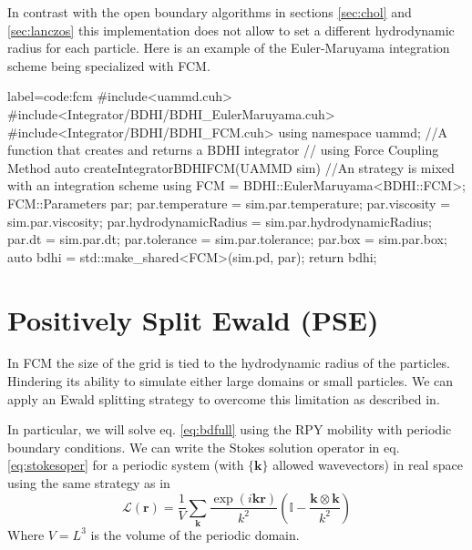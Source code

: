 \documentclass[ twoside,openright,titlepage,numbers=noenddot,%
headinclude,footinclude,cleardoublepage=empty,abstract=on,
BCOR=5mm,paper=a4,fontsize=11pt, dvipsnames
]{scrreprt}
\renewcommand{\vec}[1]{\bm{#1}}
\newcommand{\oper}[1]{\mathcal{#1}}
\newcommand{\fpos}{r}
\begin{document}
In contrast with the open boundary algorithms in sections \ref{sec:chol} and \ref{sec:lanczos} this implementation does not allow to set a different hydrodynamic radius for each particle.
Here is an example of the Euler-Maruyama integration scheme being specialized with \gls{FCM}.
\begin{code2} {label=code:fcm}
#include<uammd.cuh>
#include<Integrator/BDHI/BDHI_EulerMaruyama.cuh>
#include<Integrator/BDHI/BDHI_FCM.cuh>
using namespace uammd;
//A function that creates and returns a BDHI integrator
// using Force Coupling Method
auto createIntegratorBDHIFCM(UAMMD sim){   
  //An strategy is mixed with an integration scheme
  using FCM = BDHI::EulerMaruyama<BDHI::FCM>;
  FCM::Parameters par;
  par.temperature = sim.par.temperature;
  par.viscosity = sim.par.viscosity;
  par.hydrodynamicRadius = sim.par.hydrodynamicRadius;
  par.dt = sim.par.dt;
  par.tolerance = sim.par.tolerance;
  par.box = sim.par.box;
  auto bdhi = std::make_shared<FCM>(sim.pd, par);
  return bdhi;
}
\end{code2}

\newpage

\section{Positively Split Ewald (PSE)}\label{sec:pse}
In \gls{FCM} the size of the grid is tied to the hydrodynamic radius of the particles. Hindering its ability to simulate either large domains or small particles.
We can apply an Ewald splitting strategy to overcome this limitation as described in\cite{Fiore2017}.

In particular, we will solve eq. \eqref{eq:bdfull} using the \gls{RPY} mobility with periodic boundary conditions. We can write the Stokes solution operator in eq. \eqref{eq:stokesoper} for a periodic system (with $\{\vec{k}\}$ allowed wavevectors) in real space using the same strategy as in\cite{Hasimoto1959}
\begin{equation}
  \label{eq:psestokesoper}
  \oper{L}(\vec{\fpos}) = \frac{1}{V}\sum_{\vec{k}} \frac{\exp(i\vec{k}\vec{r})}{k^2}\left(\mathbb{I} - \frac{\vec{k}\otimes\vec{k}}{k^2}\right)
\end{equation}
Where $V = L^3$ is the volume of the periodic domain.
\end{document}
